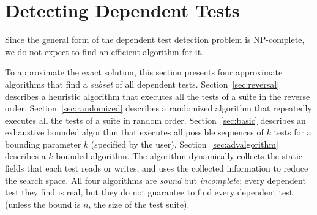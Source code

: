 \section{Detecting Dependent Tests}
\label{sec:detecting}

\newcommand{\smalltrialnum}{10\xspace}
\newcommand{\mediumtrialnum}{100\xspace}
\newcommand{\trialnum}{1000\xspace}

\newcommand{\testlist}[0]{\ensuremath{T^k_i}}
\newcommand{\executeTestsInOrder}[1]{\result{#1}{\env_0}}

Since the general form of the dependent test detection problem is
NP-complete, we do not expect to find an efficient algorithm for it.

To approximate the exact solution, this section
presents four approximate algorithms that find a \textit{subset} of
all dependent tests.
Section~\ref{sec:reversal} describes a heuristic algorithm
that executes all the tests of a suite in the reverse order.
Section~\ref{sec:randomized} describes a randomized algorithm
that repeatedly executes all the tests of a suite in random order.
Section~\ref{sec:basic} describes an exhaustive bounded algorithm that
executes all possible sequences of $k$ tests for a bounding parameter $k$
(specified by the user).
Section~\ref{sec:advalgorithm} describes a \dependenceaware{} $k$-bounded algorithm.
The \dependenceaware{} algorithm dynamically collects the
static fields that each test
reads or writes, and uses the collected information to reduce the search space.
All four algorithms are \textit{sound} but \textit{incomplete}:
every dependent test they find is real, but they do not
guarantee to find every dependent test (unless the bound is $n$,
the size of the test suite).


